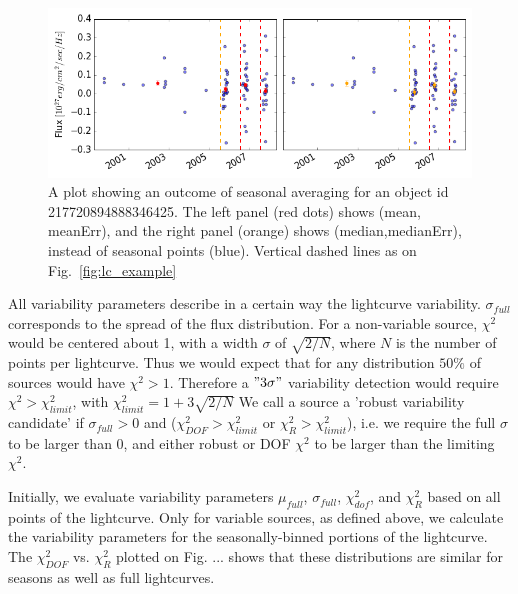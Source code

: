 \documentclass[fleqn,usenatbib]{mnras}  %
\begin{document}
\begin{figure}
\label{fig:lc_example_seasonal}
 \includegraphics[width=\textwidth]{Lightcurve_full_seasonal_obj_217720894888346425.png}
 \cprotect\caption{A plot showing an outcome of seasonal averaging for an object id 217720894888346425. The left panel (red dots) shows  (mean, meanErr),  and the right panel (orange) shows (median,medianErr), instead of seasonal points (blue). Vertical dashed lines as on Fig.~\ref{fig:lc_example}}
\end{figure}


%
%

%
%

%
% 
All variability parameters describe in a certain way the lightcurve variability. $\sigma_{full}$  corresponds to the spread of the flux distribution. For a non-variable source, $\chi^{2}$ would be centered about 1, with a width $\sigma$ of $\sqrt{2/N}$, where $N$ is the number of points per lightcurve. Thus we would expect that for any distribution $50\%$ of sources would have $\chi^{2}>1$. Therefore a $"3\sigma"$ variability detection would require $\chi^{2} > \chi^{2}_{limit}$, with $\chi^{2}_{limit} = 1 + 3\sqrt{2/N}$
We call a source a 'robust variability candidate' if $\sigma_{full}>0$ and ($\chi^{2}_{DOF} > \chi^{2}_{limit}$ or $\chi^{2}_{R} > \chi^{2}_{limit}$), i.e. we require the full $\sigma$ to be larger than 0, and either robust or DOF $\chi^{2}$ to be larger than the limiting $\chi^{2}$. 

%
% 

Initially, we evaluate variability parameters $\mu_{full}$, $\sigma_{full}$, $\chi^{2}_{dof}$, and $\chi^{2}_{R}$ based on all points of the lightcurve. Only for variable sources, as defined above, we calculate the variability parameters for the seasonally-binned portions of the lightcurve. The $\chi^{2}_{DOF}$ vs. $\chi^{2}_{R}$ plotted on Fig. ...  shows that these distributions are similar for seasons as well as full lightcurves.    
\end{document}
